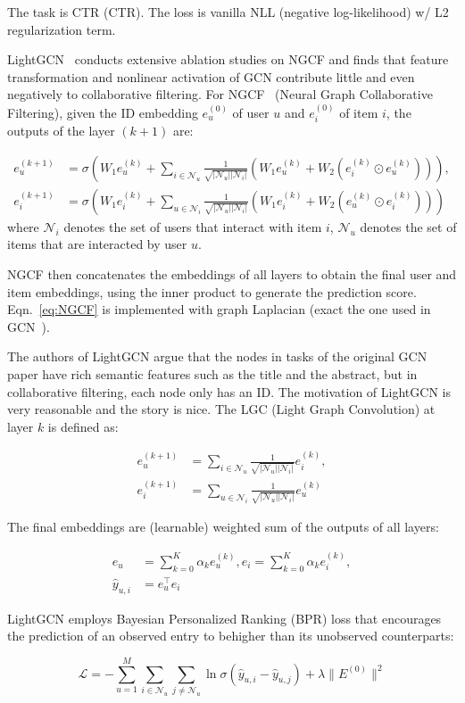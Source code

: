 The task is CTR (CTR).
The loss is vanilla NLL (negative log-likelihood) w/ L2 regularization term.

LightGCN~ conducts extensive ablation studies on NGCF and finds that feature transformation and nonlinear activation of GCN contribute little and even negatively to collaborative filtering.
For NGCF~ (Neural Graph Collaborative Filtering), given the ID embedding $e_u^{(0)}$ of user $u$ and $e_i^{(0)}$ of item $i$, the outputs of the layer $(k+1)$ are:

\begin{align}
	e_u^{(k+1)} &= \sigma\left( W_1 e_u^{(k)} + \sum_{i \in \mathcal{N}_u} \frac{1}{\sqrt{|\mathcal{N}_u||\mathcal{N}_i|}} (W_1 e_u^{(k)} + W_2(e_i^{(k)} \odot e_u^{(k)})) \right), \nonumber \\
	e_i^{(k+1)} &= \sigma\left( W_1 e_i^{(k)} + \sum_{u \in \mathcal{N}_i} \frac{1}{\sqrt{|\mathcal{N}_u||\mathcal{N}_i|}} (W_1 e_i^{(k)} + W_2(e_u^{(k)} \odot e_i^{(k)})) \right) \label{eq:NGCF}
\end{align}
where $\mathcal{N}_i$ denotes the set of users that interact with item $i$, $\mathcal{N}_u$ denotes the set of items that are interacted by user $u$.

NGCF then concatenates the embeddings of all layers to obtain the final user and item embeddings, using the inner product to generate the prediction score.
Eqn.~\ref{eq:NGCF} is implemented with graph Laplacian (exact the one used in GCN~).

The authors of LightGCN argue that the nodes in tasks of the original GCN paper have rich semantic features such as the title and the abstract, but in collaborative filtering, each node only has an ID.
The motivation of LightGCN is very reasonable and the story is nice.
The LGC (Light Graph Convolution) at layer $k$ is defined as:

\begin{align}
	e_u^{(k+1)} &= \sum_{i \in \mathcal{N}_u} \frac{1}{\sqrt{|\mathcal{N}_u||\mathcal{N}_i|}} e_i^{(k)}, \\
	e_i^{(k+1)} &= \sum_{u \in \mathcal{N}_i} \frac{1}{\sqrt{|\mathcal{N}_u||\mathcal{N}_i|}} e_u^{(k)}
\end{align}

The final embeddings are (learnable) weighted sum of the outputs of all layers:

\begin{align}
	e_u &= \sum_{k=0}^K \alpha_k e_u^{(k)}, e_i = \sum_{k=0}^K \alpha_k e_i^{(k)}, \\
	\hat{y}_{u,i} &= e_u^\top e_i
\end{align}

LightGCN employs Bayesian Personalized Ranking (BPR) loss that encourages the prediction of an observed entry to behigher than its unobserved counterparts:

\begin{equation}
	\mathcal{L} = - \sum_{u=1}^M \sum_{i \in \mathcal{N}_u} \sum_{j \ne \mathcal{N}_u} \ln \sigma (\hat{y}_{u,i} - \hat{y}_{u,j}) + \lambda \lVert E^{(0)} \rVert^2
\end{equation}

